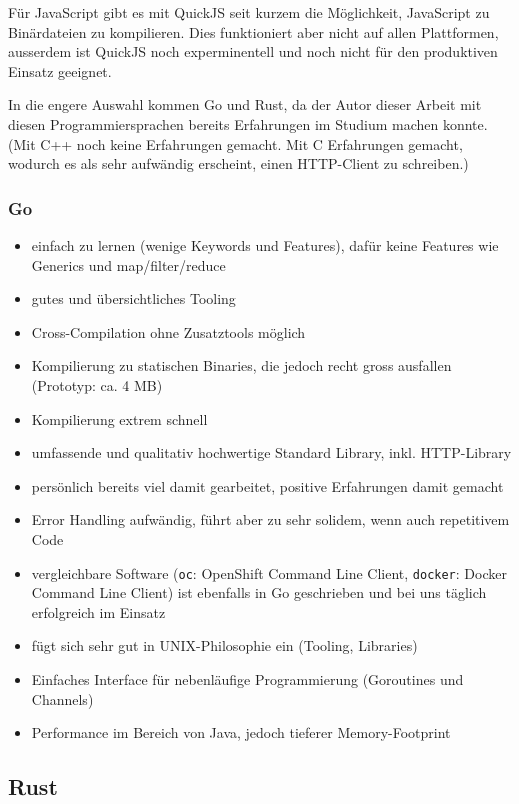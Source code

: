 Für JavaScript gibt es mit QuickJS seit kurzem die Möglichkeit, JavaScript zu Binärdateien zu kompilieren. Dies funktioniert aber nicht auf allen Plattformen, ausserdem ist QuickJS noch experminentell und noch nicht für den produktiven Einsatz geeignet.

In die engere Auswahl kommen Go und Rust, da der Autor dieser Arbeit mit diesen Programmiersprachen bereits Erfahrungen im Studium machen konnte. (Mit C++ noch keine Erfahrungen gemacht. Mit C Erfahrungen gemacht, wodurch es als sehr aufwändig erscheint, einen HTTP-Client zu schreiben.)

\subsubsection{Go}

\begin{itemize}
    \item einfach zu lernen (wenige Keywords und Features), dafür keine Features wie Generics und map/filter/reduce
    \item gutes und übersichtliches Tooling
    \item Cross-Compilation ohne Zusatztools möglich
    \item Kompilierung zu statischen Binaries, die jedoch recht gross ausfallen (Prototyp: ca. 4 MB)
    \item Kompilierung extrem schnell
    \item umfassende und qualitativ hochwertige Standard Library, inkl. HTTP-Library
    \item persönlich bereits viel damit gearbeitet, positive Erfahrungen damit gemacht
    \item Error Handling aufwändig, führt aber zu sehr solidem, wenn auch repetitivem Code
    \item vergleichbare Software (\texttt{oc}: OpenShift Command Line Client, \texttt{docker}: Docker Command Line Client) ist ebenfalls in Go geschrieben und bei uns täglich erfolgreich im Einsatz
    \item fügt sich sehr gut in UNIX-Philosophie ein (Tooling, Libraries)
    \item Einfaches Interface für nebenläufige Programmierung (Goroutines und Channels)
    \item Performance im Bereich von Java, jedoch tieferer Memory-Footprint
\end{itemize}

\subsection{Rust}

